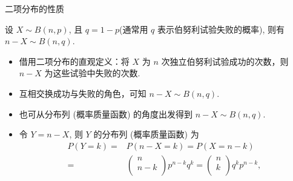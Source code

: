 \begin{frame}{二项分布的性质}
	\begin{thm}\label{338} 设 $X\sim B (n,p)$, 且 $q=1-p$(通常用 $q$ 表示伯努利试验失败的概率), 则有 $n-X\sim B (n,q)$.
	\end{thm}

	\pause
	\begin{itemize}[<+-|alert@+>]
		\item 借用二项分布的直观定义：将 $X$ 为 $n$ 次独立伯努利试验成功的次数，则 $n-X$ 为这些试验中失败的次数.
		\item 互相交换成功与失败的角色，可知 $n-X\sim B (n,q)$.
		\item 也可从分布列 (概率质量函数) 的角度出发得到
		      $n-X\sim B(n,q).$
		\item 令 $Y=n-X$, 则 $Y$ 的分布列 (概率质量函数) 为 \pause
		      \begin{equation*}
			      \begin{aligned}
				      P(Y=k)= & P(n-X=k)=P(X=n-k)                                                           \\
				      =       & \left(\begin{matrix}
						                      n   \\
						                      n-k \\
					                      \end{matrix}\right)p^{n-k}q^{k}=\left(\begin{matrix}
						                                                            n \\
						                                                            k \\
					                                                            \end{matrix}\right)q^kp^{n-k},
			      \end{aligned}
		      \end{equation*}
	\end{itemize}
\end{frame}

